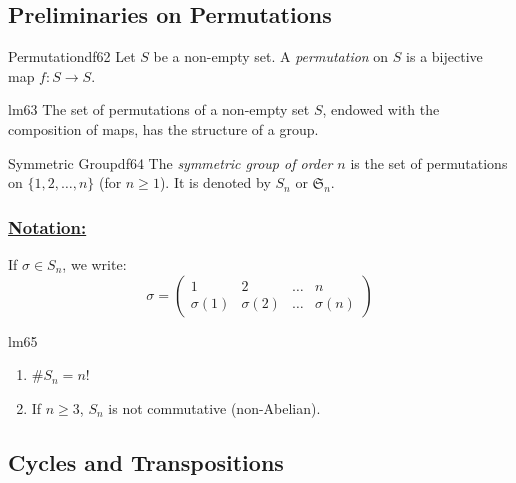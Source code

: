 \documentclass[11pt, a4paper]{article}
\begin{document}

\subsection{Preliminaries on Permutations}

\begin{definition}{Permutation}{df62}
  Let $S$ be a non-empty set. A \emph{permutation} on $S$ is a bijective map $f: S \to S$.
\end{definition}

\begin{lemma}{}{lm63}
  The set of permutations of a non-empty set $S$, endowed with the composition of maps, has the structure of a group.
\end{lemma}

\begin{definition}{Symmetric Group}{df64}
  The \emph{symmetric group of order $n$} is the set of permutations on $\{1, 2, \dots, n\}$ (for $n \ge 1$). It is denoted by $S_n$ or $\mathfrak{S}_n$.
\end{definition}

\subsubsection*{\underline{Notation:}}
If $\sigma \in S_n$, we write:
\[
  \sigma = \begin{pmatrix} 1 & 2 & \dots & n \\ \sigma(1) & \sigma(2) & \dots & \sigma(n) \end{pmatrix}
\]

\begin{lemma}{}{lm65}
  \begin{enumerate}
    \item $\# S_n = n!$
    \item If $n \ge 3$, $S_n$ is not commutative (non-Abelian).
  \end{enumerate}
\end{lemma}

\subsection{Cycles and Transpositions}
\end{document}
